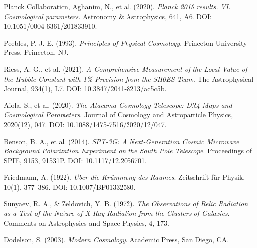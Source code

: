 \documentclass[a4paper,12pt]{article}
\theoremstyle{definition}
\theoremstyle{remark}
\begin{document}
\begin{thebibliography}{9}
	
	Planck Collaboration, Aghanim, N., et al. (2020). 
	\textit{Planck 2018 results. VI. Cosmological parameters}. 
	Astronomy \& Astrophysics, 641, A6. 
	DOI: 10.1051/0004-6361/201833910.
	
	Peebles, P. J. E. (1993). 
	\textit{Principles of Physical Cosmology}. 
	Princeton University Press, Princeton, NJ.
	
	Riess, A. G., et al. (2021). 
	\textit{A Comprehensive Measurement of the Local Value of the Hubble Constant with 1\% Precision from the SH0ES Team}. 
	The Astrophysical Journal, 934(1), L7. 
	DOI: 10.3847/2041-8213/ac5c5b.
	
	Aiola, S., et al. (2020). 
	\textit{The Atacama Cosmology Telescope: DR4 Maps and Cosmological Parameters}. 
	Journal of Cosmology and Astroparticle Physics, 2020(12), 047. 
	DOI: 10.1088/1475-7516/2020/12/047.
	
	Benson, B. A., et al. (2014). 
	\textit{SPT-3G: A Next-Generation Cosmic Microwave Background Polarization Experiment on the South Pole Telescope}. 
	Proceedings of SPIE, 9153, 91531P. 
	DOI: 10.1117/12.2056701.
	
	Friedmann, A. (1922). 
	\textit{Über die Krümmung des Raumes}. 
	Zeitschrift für Physik, 10(1), 377–386. 
	DOI: 10.1007/BF01332580.
	
	Sunyaev, R. A., \& Zeldovich, Y. B. (1972). 
	\textit{The Observations of Relic Radiation as a Test of the Nature of X-Ray Radiation from the Clusters of Galaxies}. 
	Comments on Astrophysics and Space Physics, 4, 173.
	
	Dodelson, S. (2003). 
	\textit{Modern Cosmology}. 
	Academic Press, San Diego, CA.
	
\end{thebibliography}
\end{document}
